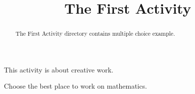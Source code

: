 \documentclass{ximera}
\title{The First Activity}
\begin{document}
  
\begin{abstract}  
The First Activity directory contains multiple choice example.
\end{abstract}  
\maketitle  
This activity is about creative work.  
\begin{exercise}  
  Choose the best place to work on mathematics.  
  \begin{multipleChoice}  
  \end{multipleChoice}  
\end{exercise}  
\end{document}
